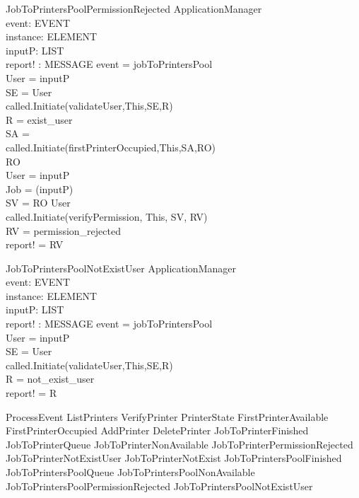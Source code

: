 \begin{schema}{JobToPrintersPoolPermissionRejected}
\Delta ApplicationManager \\
event: EVENT \\
instance: ELEMENT \\
inputP: LIST \\
report! : MESSAGE
\where event = jobToPrintersPool \\
User = \head inputP \\
SE = \lseq User \rseq \\
called.Initiate(validateUser,This,SE,R) \\
R = exist\_user \\
SA = \lseq  \rseq \\
called.Initiate(firstPrinterOccupied,This,SA,RO) \\
RO \neq \emptyset \\
User = \head inputP \\
Job = \head (\tail inputP) \\

SV = \lseq RO User \rseq \\
called.Initiate(verifyPermission, This, SV, RV) \\
RV = permission\_rejected \\

report! = RV
\end{schema}

\begin{schema}{JobToPrintersPoolNotExistUser}
\Delta ApplicationManager \\
event: EVENT \\
instance: ELEMENT \\
inputP: LIST \\
report! : MESSAGE
\where event = jobToPrintersPool \\
User = \head inputP \\
SE = \lseq User \rseq \\
called.Initiate(validateUser,This,SE,R) \\
R = not\_exist\_user \\
report! = R
\end{schema}

\begin{zed}
ProcessEvent
             \sdef ListPrinters 
             \lor VerifyPrinter
             \lor PrinterState
             \lor FirstPrinterAvailable
             \lor FirstPrinterOccupied
             \lor AddPrinter
             \lor DeletePrinter
             \lor JobToPrinterFinished
             \lor JobToPrinterQueue
             \lor JobToPrinterNonAvailable
             \lor JobToPrinterPermissionRejected
             \lor JobToPrinterNotExistUser
             \lor JobToPrinterNotExist
             \lor JobToPrintersPoolFinished
             \lor JobToPrintersPoolQueue
             \lor JobToPrintersPoolNonAvailable
             \lor JobToPrintersPoolPermissionRejected
             \lor JobToPrintersPoolNotExistUser
\end{zed}